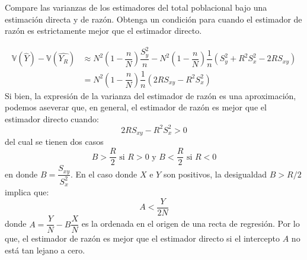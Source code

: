\addpoints
\question[10] Compare las varianzas de los estimadores del total poblacional bajo una estimación directa y de razón. Obtenga un condición para cuando el estimador de razón es estrictamente mejor que el estimador directo.
\begin{solution}
\begin{align*}
\mathbb{V}(\widehat{Y})-\mathbb{V}(\widehat{Y_R})&\approx N^2\left(1-\dfrac{n}{N}\right)\dfrac{S_{y}^2}{n}-N^2\left(1-\dfrac{n}{N}\right)\dfrac{1}{n}\left(S_{y}^2+R^2 S_{x}^{2}-2R S_{xy}\right)\\
&=N^2\left(1-\dfrac{n}{N}\right)\dfrac{1}{n}\left(2RS_{xy}-R^2S_{x}^2\right)
\end{align*}
Si bien, la expresión de la varianza del estimador de razón es una aproximación, podemos aseverar que, en general, el estimador de razón es mejor que el estimador directo cuando:
$$2RS_{xy}-R^2S_{x}^2>0$$
del cual se tienen dos casos
$$B> \dfrac{R}{2} \text{ si }R>0 \text{ y } B< \dfrac{R}{2} \text{ si } R<0$$
en donde $B=\dfrac{S_{xy}}{S_{x}^2}$. En el caso donde $X$ e $Y$ son positivos, la desigualdad $B>R/2$ implica que:
$$A<\dfrac{Y}{2N}$$
donde $A=\dfrac{Y}{N}-B\dfrac{X}{N}$ es la ordenada en el origen de una recta de regresión. Por lo que, el estimador de razón es mejor que el estimador directo si el intercepto $A$ no está tan lejano a cero.
\end{solution}